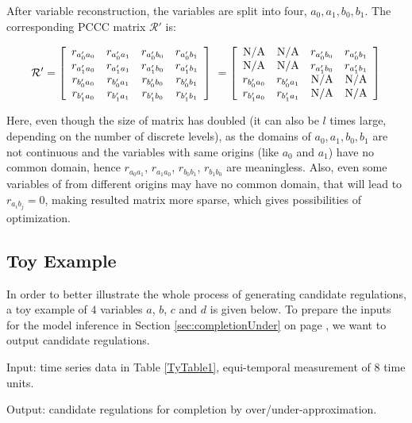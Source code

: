After variable reconstruction, the variables are split into four, $a_0,a_1,b_0,b_1$.
The corresponding PCCC matrix $\mathcal{R}'$ is:

$$\mathcal{R}'=\left[
\begin{array}{*{20}c}
r_{a'_0a_0} & r_{a'_0a_1}& r_{a'_0b_0}&r_{a'_0b_1}\\
r_{a'_1a_0} & r_{a'_1a_1}& r_{a'_1b_0}&r_{a'_1b_1}\\
r_{b'_0a_0} & r_{b'_0a_1}& r_{b'_0b_0}&r_{b'_0b_1}\\
r_{b'_1a_0} & r_{b'_1a_1}& r_{b'_1b_0}&r_{b'_1b_1}\\
\end{array}
\right]\ =\left[\begin{array}{*{20}c}
{\rm N/A} & {\rm N/A}& r_{a'_0b_0}&r_{a'_0b_1}\\
{\rm N/A} & {\rm N/A}& r_{a'_1b_0}&r_{a'_1b_1}\\
r_{b'_0a_0} & r_{b'_0a_1}& {\rm N/A}&{\rm N/A}\\
r_{b'_1a_0} & r_{b'_1a_1}& {\rm N/A}&{\rm N/A}\\
\end{array}\right]$$

Here, even though the size of matrix has doubled (it can also be $l$ times large, depending on the number of discrete levels), as the domains of $a_0,a_1,b_0,b_1$ are not continuous and the variables with same origins (like $a_0$ and $a_1$) have no common domain, hence $r_{a_0a_1}$, $r_{a_1a_0}$, $r_{b_0b_1}$, $r_{b_1b_0}$ are meaningless. 
Also, even some variables of from different origins may have no common domain, that will lead to $r_{a_ib_j}=0$, making resulted matrix more sparse, which gives possibilities of optimization.

\subsection{Toy Example}

In order to better illustrate the whole process of generating candidate regulations, a toy example of $4$ variables $a$, $b$, $c$ and $d$ is given below.
To prepare the inputs for the model inference in Section \ref{sec:completionUnder} on page \pageref{sec:completionUnder}, we want to output candidate regulations.

Input: time series data in Table \ref{TyTable1}, equi-temporal measurement of 8 time units.

Output: candidate regulations for completion by over/under-approximation.

